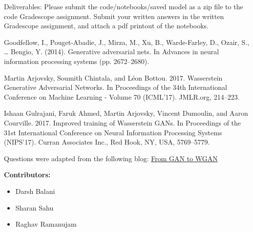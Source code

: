 \documentclass[11pt]{article}
\date{Fall 2022}
\begin{document}
\maketitle

Deliverables:  Please submit the code/notebooks/saved model as a zip file to the code Gradescope assignment.  Submit your written answers in the written Gradescope assignment, and attach a pdf printout of the notebooks.

\begin{qunlist}
    
    \newpage
    
    \newpage
    
    \newpage
    
    
\end{qunlist}

\vspace{60mm}

\begin{squarelist} 
    \item Goodfellow, I., Pouget-Abadie, J., Mirza, M., Xu, B., Warde-Farley, D., Ozair, S., … Bengio, Y. (2014). Generative adversarial nets. In Advances in neural information processing systems (pp. 2672–2680).
    \item Martin Arjovsky, Soumith Chintala, and Léon Bottou. 2017. Wasserstein Generative Adversarial Networks. In Proceedings of the 34th International Conference on Machine Learning - Volume 70 (ICML'17). JMLR.org, 214–223.
    \item Ishaan Gulrajani, Faruk Ahmed, Martin Arjovsky, Vincent Dumoulin, and Aaron Courville. 2017. Improved training of Wasserstein GANs. In Proceedings of the 31st International Conference on Neural Information Processing Systems (NIPS'17). Curran Associates Inc., Red Hook, NY, USA, 5769–5779.
    \item Questions were adapted from the following blog: \href{https://lilianweng.github.io/posts/2017-08-20-gan/}{From GAN to WGAN}

\end{squarelist}


\vspace{20mm}

\textbf{Contributors:}
\begin{itemize}
    \item Darsh Balani
    \item Sharan Sahu
    \item Raghav Ramanujam
\end{itemize}
\end{document}
